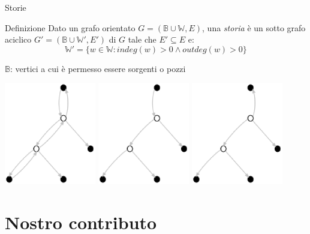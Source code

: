 \documentclass{beamer}
\begin{document}
\begin{frame}{Storie}
  \begin{block}{Definizione}
  Dato un grafo orientato $G = (\mathbb{B} \cup \mathbb{W}, E)$, una
  \emph{storia} \`e un sotto grafo aciclico $G' = (\mathbb{B} \cup
  \mathbb{W'}, E')$ di $G$ tale che $E' \subseteq E $ e:
  \begin{displaymath}
    \mathbb{W'} = \{w \in \mathbb{W}: indeg(w) > 0 \wedge outdeg(w)
    > 0\}
  \end{displaymath}
\end{block}
$\mathbb{B}$: vertici a cui \`e permesso essere sorgenti o pozzi
\begin{center} 
  \includegraphics[width=0.3\textwidth]{images/graph-with-b-setted.eps} 
  \includegraphics[width=0.3\textwidth]{images/story-example.eps} 
  \includegraphics[width=0.3\textwidth]{images/non-story-example.eps}
\end{center} 
\end{frame}

\section{Nostro contributo}
\end{document}
